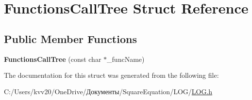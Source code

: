 \hypertarget{struct_functions_call_tree}{
\section{FunctionsCallTree Struct Reference}
\label{struct_functions_call_tree}
}
\subsection*{Public Member Functions}
\begin{DoxyCompactItemize}
\item 
\hypertarget{struct_functions_call_tree_ad43a1620d10ede1bdb9943be61d6a886}{
{\bfseries FunctionsCallTree} (const char $\ast$\_\-funcName)}
\label{struct_functions_call_tree_ad43a1620d10ede1bdb9943be61d6a886}

\end{DoxyCompactItemize}


The documentation for this struct was generated from the following file:\begin{DoxyCompactItemize}
\item 
C:/Users/kvv20/OneDrive/Документы/SquareEquation/LOG/\hyperlink{_l_o_g_8h}{LOG.h}\end{DoxyCompactItemize}
